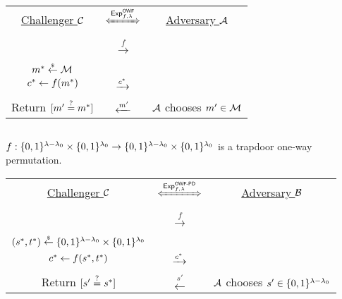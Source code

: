 \documentclass{article}
\begin{document}
\begin{tcolorbox}[colback=white]
	\centering
	\begin{tabularx}{\linewidth}{CcC}
		\underline{Challenger $\mathcal{C}$} & 
		$\xLeftrightarrow{\Exp^{\owf}_{f, \sp}}$ & 
		\underline{Adversary $\mathcal{A}$} \\

		 \\

		& 
		$\xrightarrow{f}$ & 
	     \\

		 \\

		$m^* \overset{{\scriptscriptstyle\$}}{\leftarrow} \mathcal{M}$ \\
		$c^* \gets f(m^*)$ &
		$\xrightarrow{c^*}$ &
		 \\

		 \\

		Return $[m' \overset{?}{=} m^*]$ & 
		$\xleftarrow{m'}$ & 
		$\mathcal{A}$ chooses $m' \in \mathcal{M}$ \\
  \end{tabularx}
\end{tcolorbox}


\subsection{\owfpd}

$f: \{0, 1\}^{\lambda - \lambda_0} \times \{0, 1\}^{\lambda_0} \to \{0, 1\}^{\lambda -
\lambda_0} \times \{0, 1\}^{\lambda_0}$ is a trapdoor one-way permutation.

\begin{tcolorbox}[colback=white]
	\centering
	\begin{tabularx}{\linewidth}{CcC}
		\underline{Challenger $\mathcal{C}$} & 
		$\xLeftrightarrow{\Exp^{\owfpd}_{f, \sp}}$ & 
		\underline{Adversary $\mathcal{B}$} \\

		 \\

		 & 
		$\xrightarrow{f}$ & 
	   \\

		 \\

		$(s^*, t^*) \overset{{\scriptscriptstyle\$}}{\leftarrow} \{0, 1\}^{\lambda - \lambda_0} \times \{0, 1\}^{\lambda_0}$ \\
		$c^* \gets f(s^*, t^*)$ &
		$\xrightarrow{c^*}$ &
		 \\

		 \\

		Return $[s' \overset{?}{=} s^*]$ & 
		$\xleftarrow{s'}$ & 
		$\mathcal{A}$ chooses $s' \in \{0, 1\}^{\lambda - \lambda_0}$ \\
  \end{tabularx}
\end{tcolorbox}
\end{document}
